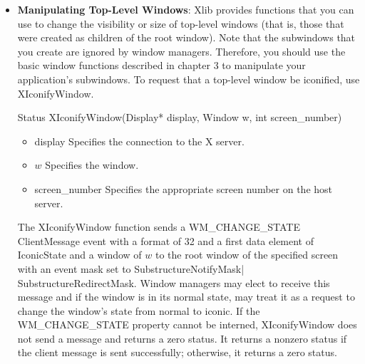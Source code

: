\documentclass{report}
\begin{document}
\begin{itemize}
\begin{itemize}
\begin{itemize}
                \item Set and read the WM\_HINTS property
                \item Set and read the WM\_NORMAL\_HINTS property
                \item Set and read the WM\_CLASS property
                \item Set and read the WM\_TRANSIENT\_FOR property
                \item Set and read the WM\_PROTOCOLS property
                \item Set and read the WM\_COLORMAP\_WINDOWS property
                \item Set and read the WM\_ICON\_SIZE property
                \item Use window manager convenience functions
            \end{itemize}
        \item \textbf{Manipulating Top-Level Windows}: Xlib provides functions that you can use to change the visibility or size of top-level windows (that is, those that were created as children of the root window). Note that the subwindows that you create are ignored by window managers. Therefore, you should use the basic window functions described in chapter 3 to manipulate your application’s subwindows.
            \bigbreak \noindent 
            To request that a top-level window be iconified, use XIconifyWindow.
            \bigbreak \noindent 
            \begin{cppcode}
                Status XIconifyWindow(Display* display, Window w, int screen_number)
            \end{cppcode}
            \bigbreak \noindent
            \begin{itemize}
                \item display Specifies the connection to the X server.
                \item $w$ Specifies the window.
                \item screen\_number Specifies the appropriate screen number on the host server.
            \end{itemize}
            The XIconifyWindow function sends a WM\_CHANGE\_STATE ClientMessage event with a format of 32 and a first data element of IconicState and a window of $w$ to the root window of the specified screen with an event mask set to SubstructureNotifyMask| SubstructureRedirectMask. Window managers may elect to receive this message and if the window is in its normal state, may treat it as a request to change the window’s state from normal to iconic. If the WM\_CHANGE\_STATE property cannot be interned, XIconifyWindow does not send a message and returns a zero status. It returns a nonzero status if the client message is sent successfully; otherwise, it returns a zero status.

\end{itemize}
\end{itemize}
\end{document}
